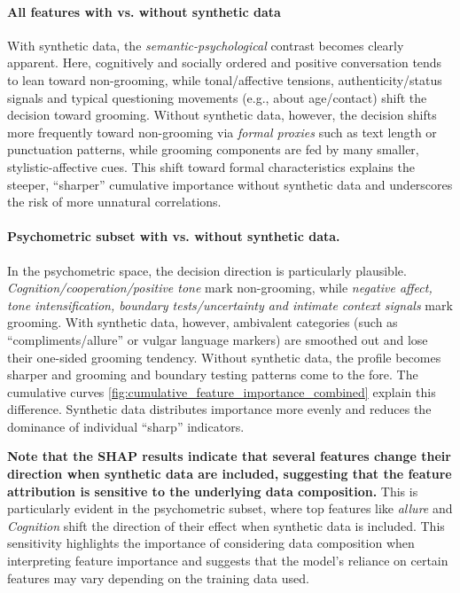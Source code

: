 \paragraph{All features with vs. without synthetic data}
With synthetic data, the \emph{semantic-psychological} contrast becomes clearly apparent. Here, cognitively and socially ordered and positive conversation tends to lean toward non-grooming, while tonal/affective tensions, authenticity/status signals and typical questioning movements (e.g., about age/contact) shift the decision toward grooming. Without synthetic data, however, the decision shifts more frequently toward non-grooming via \emph{formal proxies} such as text length or punctuation patterns, while grooming components are fed by many smaller, stylistic-affective cues. This shift toward formal characteristics explains the steeper, “sharper” cumulative importance without synthetic data and underscores the risk of more unnatural correlations.

\paragraph{Psychometric subset with vs. without synthetic data.}
In the psychometric space, the decision direction is particularly plausible.
\emph{Cognition/cooperation/positive tone} mark non-grooming, while \emph{negative affect, tone intensification, boundary tests/uncertainty and intimate context signals} mark grooming. With synthetic data, however, ambivalent categories (such as “compliments/allure” or vulgar language markers) are smoothed out and lose their one-sided grooming tendency. Without synthetic data, the profile becomes sharper and grooming and boundary testing patterns come to the fore. The cumulative curves \ref{fig:cumulative_feature_importance_combined} explain this difference. Synthetic data distributes importance more evenly and reduces the dominance of individual “sharp” indicators.

\textbf{ Note that the SHAP results indicate that several features change their direction when synthetic data are included, suggesting that the feature attribution is sensitive to the underlying data composition.} This is particularly evident in the psychometric subset, where top features like \textit{allure} and \textit{Cognition} shift the direction of their effect when synthetic data is included. This sensitivity highlights the importance of considering data composition when interpreting feature importance and suggests that the model's reliance on certain features may vary depending on the training data used.


